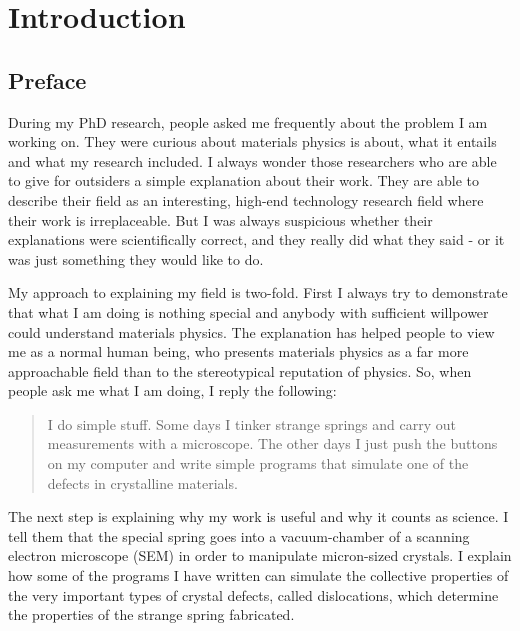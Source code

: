 
\chapter{Introduction}  %

\ifpdf
    \graphicspath{{Chapter1/Figs/Raster/}{Chapter1/Figs/PDF/}{Chapter1/Figs/}}
\else
    \graphicspath{{Chapter1/Figs/Vector/}{Chapter1/Figs/}}
\fi

\section{Preface}
During my PhD research, people asked me frequently about the problem I am working on. They were curious about materials physics is about, what it entails and what my research included. I always wonder those researchers who are able to give for outsiders a simple explanation about their work. They are able to describe their field as an interesting, high-end technology research field where their work is irreplaceable. But I was always suspicious whether their explanations were scientifically correct, and they really did what they said - or it was just something they would like to do.

My approach to explaining my field is two-fold. First I always try to demonstrate that what I am doing is nothing special and anybody with sufficient willpower could understand materials physics. The explanation has helped people to view me as a normal human being, who presents materials physics as a far more approachable field than to the stereotypical reputation of physics. So, when people ask me what I am doing, I reply the following:
\begin{quotation}
I do simple stuff. Some days I tinker strange springs and carry out measurements with a microscope. The other days I just push the buttons on my computer and write simple programs that simulate one of the defects in crystalline materials.
\end{quotation}
The next step is explaining why my work is useful and why it counts as science. I tell them that the special spring goes into a vacuum-chamber of a scanning electron microscope (SEM) in order to manipulate micron-sized crystals. I explain how some of the programs I have written can simulate the collective properties of the very important types of crystal defects, called dislocations, which determine the properties of the strange spring fabricated.

